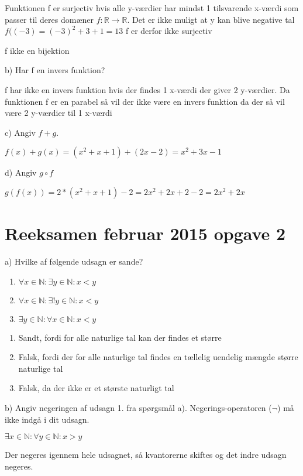 \documentclass{article}
\begin{document}
Funktionen f er surjectiv hvis alle y-værdier har mindst 1 tilsvarende x-værdi som passer til deres domæner \(f : \mathbb{R} \rightarrow \mathbb{R}\). 
Det er ikke muligt at y kan blive negative tal
\(f((-3)=(-3)^2+3+1=13\)
f er derfor ikke surjectiv  


f ikke en bijektion



b) Har f en invers funktion?

f har ikke en invers funktion hvis der findes 1 x-værdi der giver 2 y-værdier.
Da funktionen f er en parabel så vil der ikke være en invers funktion da der så vil være 2 y-værdier til 1 x-værdi


c) Angiv \(f + g\).

\(f(x)+g(x)=(x^2+x+1)+(2x-2)=x^2+3x-1\)


d) Angiv \(g \circ f\) 


\(g(f(x))=2*(x^2+x+1)-2=2x^2+2x+2-2=2x^2+2x\)

\section{Reeksamen februar 2015 opgave 2}
a) Hvilke af følgende udsagn er sande?

\begin{enumerate}
    \item $\forall x \in\mathbb{N}: \exists y \in\mathbb{N}: x < y$
    \item $\forall x \in\mathbb{N}: \exists!y \in\mathbb{N}: x < y$
    \item $\exists y \in\mathbb{N}: \forall x \in\mathbb{N}: x < y$
\end{enumerate}

\begin{enumerate}
    \item Sandt, fordi for alle naturlige tal kan der findes et større
    \item Falsk, fordi der for alle naturlige tal findes en tællelig uendelig mængde større naturlige tal
    \item Falsk, da der ikke er et største naturligt tal
\end{enumerate}

\noindent b) Angiv negeringen af udsagn 1. fra spørgsmål a). Negerings-operatoren ($\neg$) må ikke indgå i dit udsagn.

$\exists x \in\mathbb{N}: \forall y \in\mathbb{N}: x > y$

\noindent Der negeres igennem hele udsagnet, så kvantorerne skiftes og det indre udsagn negeres.
\end{document}
